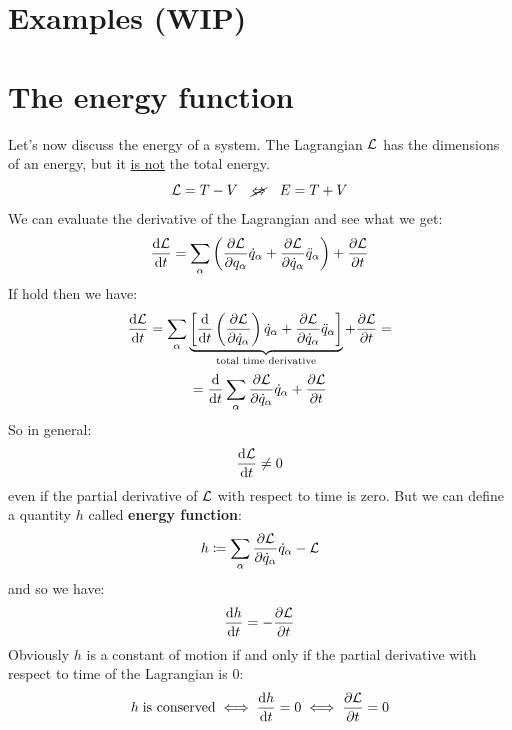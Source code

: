 \section{Examples (WIP)}
\section{The energy function}
Let's now discuss the energy of a system. The Lagrangian $\mathcal{L}$ has the dimensions of an energy, but it \underline{is not} the total energy.
\begin{equation}
    \mathcal{L} = T - V \quad \cancel{\Leftrightarrow} \quad E = T + V
\end{equation}
We can evaluate the derivative of the Lagrangian and see what we get:
\begin{equation}
    \dfrac{\dd{\lagr}}{\dd{t}} = \bigsum_{\alpha}\brackets{\pdv{\lagr}{q_{\alpha}}\dot{q}_{\alpha} + \pdv{\lagr}{\dot{q}_{\alpha}}\ddot{q}_{\alpha}} + \pdv{ \lagr}{ t}
\end{equation}
If \eleref\;hold then we have:
\begin{equation}
    \dfrac{\dd{\lagr}}{\dd{t}} = \bigsum_{\alpha}\underbrace{\sqbr{\dv{}{t}\brackets{\pdv{\lagr}{\dot{q}_{\alpha}}}\dot{q}_{\alpha} + \pdv{\lagr}{\dot{q}_{\alpha}}\ddot{q}_{\alpha}}}_{\text{total time derivative}} + \pdv{ \lagr}{ t} =
\end{equation}
\begin{equation}
 = \dv{}{t}\bigsum_{\alpha}\pdv{\lagr}{\dot{q}_{\alpha}}\dot{q}_{\alpha} + \pdv{ \lagr}{ t}
\end{equation}
So in general:
\begin{equation}
    \dfrac{\dd{\mathcal{L}}}{\dd{t}} \neq 0
\end{equation}
even if the partial derivative of $\mathcal{L}$ with respect to time is zero. But we can define a quantity $h$ called \textbf{energy function}:
\begin{equation}
    h \defineeq \bigsum_{\alpha}\pdv{\lagr}{\dot{q}_{\alpha}}\dot{q}_{\alpha} - \lagr
\end{equation}
and so we have:
\begin{equation}
    \dfrac{\dd{h}}{\dd{t}} = -\pdv{ \lagr}{ t}
\end{equation}
Obviously $h$ is a constant of motion if and only if the partial derivative with respect to time of the Lagrangian is 0:
\begin{equation}
    h\;\text{is conserved} \iff \dfrac{\dd{h}}{\dd{t}} = 0 \iff \pdv{ \lagr}{ t} = 0
\end{equation}
